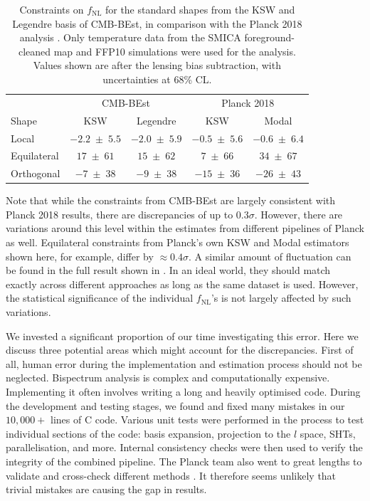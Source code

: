 \begin{table}[h]
	\caption{Constraints on $f_\text{NL}$ for the standard shapes from the KSW and Legendre basis of CMB-BEst, in comparison with the Planck 2018 analysis \cite{PlanckCollaboration2018}. Only temperature data from the SMICA foreground-cleaned map and FFP10 simulations were used for the analysis. Values shown are after the lensing bias subtraction, with uncertainties at 68\% CL.}
	\centering
	\label{table:trio_fNL_comparison_with_planck}
	\renewcommand{\arraystretch}{1.5} 
	\begin{tabular}{lcccc}
		\toprule
		& \multicolumn{2}{c}{CMB-BEst} & \multicolumn{2}{c}{Planck 2018} \\ \cmidrule(lr){2-3} \cmidrule(lr){4-5}
		Shape & KSW &  Legendre &  KSW &  Modal \\
		\midrule
		
		Local & $-2.2 \;\pm\; 5.5$ & $-2.0 \;\pm\; 5.9$ & $-0.5 \;\pm\; 5.6$ & $-0.6 \;\pm\; 6.4$ \\
		Equilateral & $17 \;\pm\; 61$ & $15 \;\pm\; 62$ & $7 \;\pm\; 66$ & $34 \;\pm\; 67$ \\
		Orthogonal & $-7 \;\pm\; 38$ & $-9 \;\pm\; 38$ & $-15 \;\pm\; 36$ & $-26 \;\pm\; 43$ \\
		\bottomrule
	\end{tabular}
\end{table}

Note that while the constraints from CMB-BEst are largely consistent with Planck 2018 results, there are discrepancies of up to $0.3\sigma$. However, there are variations around this level within the estimates from different pipelines of Planck as well. Equilateral constraints from Planck's own KSW and Modal estimators shown here, for example, differ by $\approx 0.4\sigma$. A similar amount of fluctuation can be found in the full result shown in \cite{PlanckCollaboration2018}. In an ideal world, they should match exactly across different approaches as long as the same dataset is used. However, the statistical significance of the individual $f_\text{NL}$'s is not largely affected by such variations.

We invested a significant proportion of our time investigating this error. Here we discuss three potential areas which might account for the discrepancies. First of all, human error during the implementation and estimation process should not be neglected. Bispectrum analysis is complex and computationally expensive. Implementing it often involves writing a long and heavily optimised code. During the development and testing stages, we found and fixed many mistakes in our $10,000+$ lines of \textsc{C} code. Various unit tests were performed in the process to test individual sections of the code: basis expansion, projection to the $l$ space, SHTs, parallelisation, and more. Internal consistency checks were then used to verify the integrity of the combined pipeline. The Planck team also went to great lengths to validate and cross-check different methods \cite{PlanckCollaboration2013}. It therefore seems unlikely that trivial mistakes are causing the gap in results.

